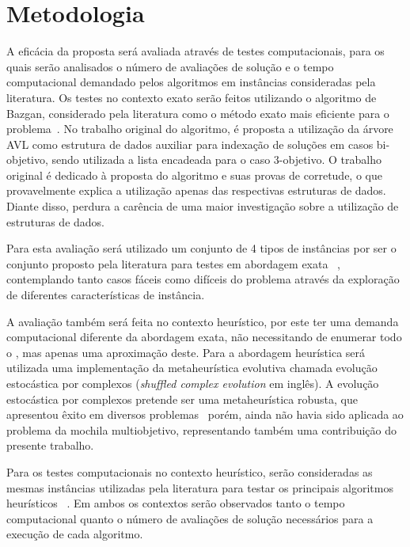 \section{Metodologia}

A eficácia da proposta será avaliada através de
testes computacionais, para os quais serão analisados o número de avaliações
de solução e o tempo computacional demandado pelos algoritmos em instâncias
consideradas pela literatura.
Os testes no contexto exato serão feitos
utilizando o algoritmo de Bazgan, considerado pela literatura
como o método exato mais eficiente para o problema~\cite{bazgan2009}.
No trabalho original do algoritmo, é proposta a utilização da árvore AVL
como estrutura de dados auxiliar para indexação de soluções em casos bi-objetivo,
sendo utilizada a lista encadeada para o caso 3-objetivo.
O trabalho original é dedicado à proposta do algoritmo e suas provas de corretude,
o que provavelmente explica a utilização apenas das respectivas estruturas de dados.
Diante disso, perdura a carência de uma maior investigação sobre a utilização de
estruturas de dados.

Para esta avaliação será utilizado um conjunto de 4 tipos de instâncias
por ser o conjunto proposto pela literatura para testes em abordagem exata
~\cite{bazgan2009,figueira2013algorithmic,correia2018},
contemplando tanto casos fáceis como difíceis do problema através da
exploração de diferentes características de instância.

A avaliação também será feita no contexto heurístico, por este ter uma demanda computacional diferente
da abordagem exata, não necessitando de enumerar todo o \paretoset{}, mas apenas uma aproximação deste.
Para a abordagem heurística será utilizada uma implementação da metaheurística
evolutiva chamada evolução estocástica por complexos (\emph{shuffled complex evolution} em inglês).
A evolução estocástica por complexos pretende ser uma metaheurística robusta,
que apresentou êxito em diversos problemas~\cite{duan1992effective, elbeltagi2007modified, zhao2015shuffled, bhattacharjee2014shuffled, baroni2015shuffled,baroni2016shuffled} porém,
ainda não havia sido aplicada ao problema da mochila multiobjetivo,
representando também uma contribuição do presente trabalho.

Para os testes computacionais no contexto heurístico,
serão consideradas as mesmas instâncias utilizadas pela literatura
para testar os principais algoritmos heurísticos
~\cite{zitzler1998multiobjective, deb2002fast,zhang2007moea,zouache2018cooperative}.
Em ambos os contextos serão observados tanto o tempo computacional quanto o número de avaliações de solução necessários
para a execução de cada algoritmo.


